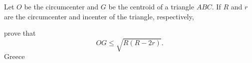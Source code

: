 Let $O$ be the circumcenter and $G$ be the centroid of a triangle $ABC$. If $R$ and $r$ are the circumcenter and incenter of the triangle, respectively,

prove that \[ OG \leq \sqrt{ R ( R - 2r ) } . \]Greece